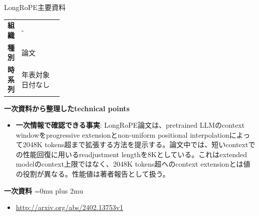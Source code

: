 \Needspace{0.38\textheight}
\begin{technicalnote}{LongRoPE}{主要資料}
\begingroup
\begin{tabularx}{\linewidth}{@{}>{\bfseries}p{0.22\linewidth}X@{}}
組織 & - \\
種別 & 論文 \\
時系列 & 年表対象日付なし \\
\end{tabularx}
\smallskip
\begin{minipage}{\linewidth}
{\bfseries 一次資料から整理したtechnical points}
\begin{itemize}[leftmargin=1.5em,itemsep=0.35em]
\item \textbf{一次情報で確認できる事実}: LongRoPE論文は、pretrained LLMのcontext windowをprogressive extensionとnon-uniform positional interpolationによって2048K tokens超まで拡張する方法を提示する。論文中では、短いcontextでの性能回復に用いるreadjustment lengthを8Kとしている。これはextended modelのcontext上限ではなく、2048K tokens超へのcontext extensionとは値の役割が異なる。性能値は著者報告として扱う。
\end{itemize}
\begin{minipage}{\linewidth}
\begin{samepage}
{\bfseries 一次資料}
\begingroup\sloppy
\Urlmuskip=0mu plus 2mu\relax
\begin{itemize}[leftmargin=1.5em,itemsep=0.25em]
\item {\scriptsize\url{http://arxiv.org/abs/2402.13753v1}}
\end{itemize}
\endgroup
\end{samepage}
\end{minipage}
\end{minipage}
\endgroup
\end{technicalnote}
\medskip

